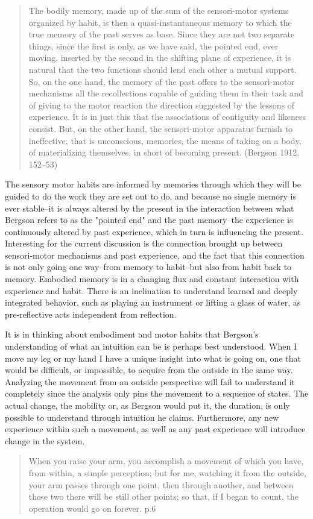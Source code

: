 \documentclass[11pt]{article}
\makeatletter
\newcommand{\cslcitation}[2]
 {\protect\hyper@linkstart{cite}{citeproc_bib_item_#1}#2\hyper@linkend}
\makeatother
\begin{document}
\begin{quote}
The bodily memory, made up of the sum of the sensori-motor systems organized by habit, is then a quasi-instantaneous memory to which the true memory of the past serves as base. Since they are not two separate things, since the first is only, as we have said, the pointed end, ever moving, inserted by the second in the shifting plane of experience, it is natural that the two functions should lend each other a mutual support. So, on the one hand, the memory of the past offers to the sensori-motor mechanisms all the recollections capable of guiding them in their task and of giving to the motor reaction the direction suggested by the lessons of experience. It is in just this that the associations of contiguity and likeness consist. But, on the other hand, the sensori-motor apparatus furnish to ineffective, that is unconscious, memories, the means of taking on a body, of materializing themselves, in short of becoming present. (\cslcitation{2}{Bergson 1912, 152–53})
\end{quote}

The sensory motor habits are informed by memories through which they will be guided to do the work they are set out to do, and because no single memory is ever stable--it is always altered by the present in the interaction between what Bergson refers to as the "pointed end" and the past memory--the experience is continuously altered by past experience, which in turn is influencing the present.
Interesting for the current discussion is the connection brought up between sensori-motor mechanisms and past experience, and the fact that this connection is not only going one way--from memory to habit--but also from habit back to memory.
Embodied memory is in a changing flux and constant interaction with experience and habit.
There is an inclination to understand learned and deeply integrated behavior, such as playing an instrument or lifting a glass of water, as pre-reflective acts independent from reflection.

It is in thinking about embodiment and motor habits that Bergson's understanding of what an intuition can be is perhaps best understood.
When I move my leg or my hand I have a unique insight into what is going on, one that would be difficult, or impossible, to acquire from the outside in the same way.
Analyzing the movement from an outside perspective will fail to understand it completely since the analysis only pins the movement to a sequence of states.
The actual change, the mobility or, as Bergson would put it, the duration, is only possible to understand through intuition he claims.
Furthermore, any new experience within such a movement, as well as any past experience will introduce change in the system.
\begin{quote}
When you raise your arm, you accomplish a movement of which you have, from within, a simple perception; but for me, watching it from the outside, your arm passes through one point, then through another, and between these two there will be still other points; so that, if I began to count, the operation would go on forever. p.6
\end{quote}
\end{document}
